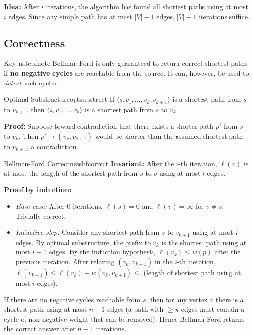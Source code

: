 \textbf{Idea:} After $i$ iterations, the algorithm has found all shortest paths using at most $i$
edges. Since any simple path has at most $|V|-1$ edges, $|V|-1$ iterations suffice.

\subsection{Correctness}

\begin{remark}{Key note}{bfnote}
Bellman-Ford is only guaranteed to return correct shortest paths if \textbf{no negative cycles}
are reachable from the source. It can, however, be used to \emph{detect} such cycles.
\end{remark}

\begin{theorem}{Optimal Substructure}{optsubstruct}
If $\langle s, v_1, \ldots, v_k, v_{k+1} \rangle$ is a shortest path from $s$ to $v_{k+1}$,
then $\langle s, v_1, \ldots, v_k \rangle$ is a shortest path from $s$ to $v_k$.

\textbf{Proof:} Suppose toward contradiction that there exists a shorter path $p'$ from $s$
to $v_k$. Then $p' \to (v_k, v_{k+1})$ would be shorter than the assumed shortest path to
$v_{k+1}$, a contradiction.
\end{theorem}

\begin{theorem}{Bellman-Ford Correctness}{bfcorrect}
\textbf{Invariant:} After the $i$-th iteration, $\ell(v)$ is at most the length of the
shortest path from $s$ to $v$ using at most $i$ edges.

\textbf{Proof by induction:}
\begin{itemize}[noitemsep]
  \item \textit{Base case:} After 0 iterations, $\ell(s) = 0$ and $\ell(v) = \infty$ for
        $v \neq s$. Trivially correct.
  \item \textit{Inductive step:} Consider any shortest path from $s$ to $v_{k+1}$ using at
        most $i$ edges. By optimal substructure, the prefix to $v_k$ is the shortest path using
        at most $i-1$ edges. By the induction hypothesis, $\ell(v_k) \le w(p)$ after the
        previous iteration. After relaxing $(v_k, v_{k+1})$ in the $i$-th iteration,
        $\ell(v_{k+1}) \le \ell(v_k) + w(v_k, v_{k+1}) \le$ (length of shortest path using
        at most $i$ edges).
\end{itemize}

If there are no negative cycles reachable from $s$, then for any vertex $v$ there is a
shortest path using at most $n-1$ edges (a path with $\ge n$ edges must contain a cycle of
non-negative weight that can be removed). Hence Bellman-Ford returns the correct answer after
$n-1$ iterations.
\end{theorem}

